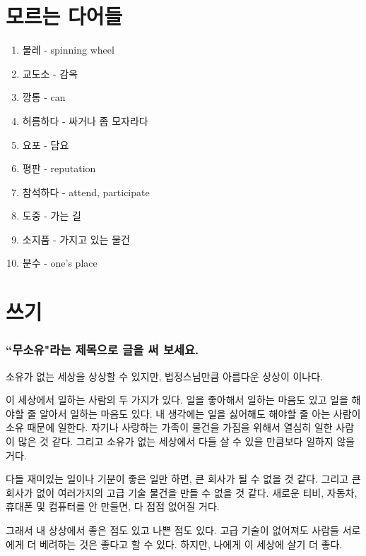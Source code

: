 \documentclass[11pt]{article}
\begin{document}
\section{모르는 다어들}
\begin{enumerate}
  \item 물레 - spinning wheel
  \item 교도소 - 감옥
  \item 깡통 - can
  \item 허름하다 - 싸거나 좀 모자라다
  \item 요포 - 담요
  \item 평판 - reputation
  \item 참석하다 - attend, participate
  \item 도중 - 가는 길
  \item 소지품 - 가지고 있는 물건
  \item 분수 - one's place
\end{enumerate}
\section{쓰기}
\doublespacing
\subsubsection*{``무소유"라는 제목으로 글을 써 보세요.}

소유가 없는 세상을 상상할 수 있지만, 법정스님만큼 아름다운 상상이 이나다.

이 세상에서 일하는 사람의 두 가지가 있다.  일을 좋아해서 일하는 마음도 있고
일을 해야할 줄 알아서 일하는 마음도 있다.  내 생각에는 일을 싫어해도 해야할 줄
아는 사람이 소유 때문에 일한다.  자기나 사랑하는 가족이 물건을 가짐을 위해서
열심히 일한 사람이 많은 것 같다.  그리고 소유가 없는 세상에서 다들 살 수 있을
만큼보다  일하지 않을 거다.

다들 재미있는 일이나 기분이 좋은 일만 하면, 큰 회사가 될 수 없을 것 같다.
그리고 큰 회사가 없이 여러가지의 고급 기술 물건을 만들 수 없을 것 같다.  새로운
티비, 자동차, 휴대폰 및 컴퓨터를 안 만들면, 다 점점 없어질 거다.


그래서 내 상상에서 좋은 점도 있고 나쁜 점도 있다.  고급 기술이 없어져도 사람들
서로에게 더 베려하는 것은 좋다고 할 수 있다.  하지만, 나에게 이 세상에 살기 더
좋다.
\end{document}
